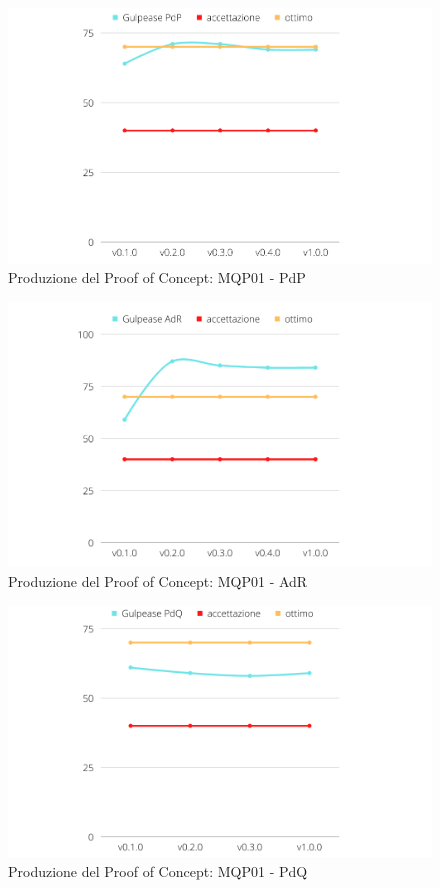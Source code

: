 \begin{figure}[H]
    \centering
    \includegraphics[scale=0.50]{Sezioni/images/poc-gulpease-pdp.png}
    \caption{Produzione del Proof of Concept: MQP01 - PdP}
\end{figure}


\begin{figure}[H]
    \centering
    \includegraphics[scale=0.50]{Sezioni/images/poc-gulpease-adr.png}
    \caption{Produzione del Proof of Concept: MQP01 - AdR}
\end{figure}


\begin{figure}[H]
    \centering
    \includegraphics[scale=0.50]{Sezioni/images/poc-gulpease-pdq.png}
    \caption{Produzione del Proof of Concept: MQP01 - PdQ}
\end{figure}